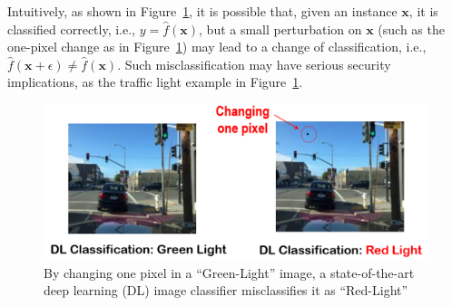 Intuitively, as shown in Figure~\ref{fig:safetytrafficlight}, it is possible that, given an instance $\textbf{x}$, it is classified correctly, i.e., $y=\hat{f}(\textbf{x})$, but a small perturbation on $\textbf{x}$ (such as the one-pixel change as in Figure~\ref{fig:safetytrafficlight}) may lead to a change of classification, i.e., $\hat{f}(\textbf{x}+\epsilon)\neq \hat{f}(\textbf{x})$. Such misclassification may have serious security implications, as the traffic light example in Figure~\ref{fig:safetytrafficlight}. 

\begin{figure}[!thbp]
  \centering
  \includegraphics[width=0.8\linewidth]{images/safetyIssues/intro9.png}
  \caption{By changing one pixel in a ``Green-Light'' image, a state-of-the-art deep learning (DL) image classifier misclassifies it as ``Red-Light'' \cite{wu2018game}}
  \label{fig:safetytrafficlight}
\end{figure}

